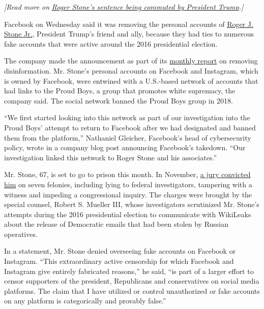 \emph{{[}Read more on}
\href{https://www.nytimes3xbfgragh.onion/2020/07/10/us/politics/trump-roger-stone-clemency.html}{\emph{Roger
Stone's sentence being commuted by President Trump}}\emph{.{]}}

Facebook on Wednesday said it was removing the personal accounts of
\href{https://www.nytimes3xbfgragh.onion/2020/07/19/us/politics/roger-stone-mo-kelly-slur.html}{Roger
J. Stone Jr.}, President Trump's friend and ally, because they had ties
to numerous fake accounts that were active around the 2016 presidential
election.

The company made the announcement as part of its
\href{https://about.fb.com/news/2020/07/removing-political-coordinated-inauthentic-behavior/}{monthly
report} on removing disinformation. Mr. Stone's personal accounts on
Facebook and Instagram, which is owned by Facebook, were entwined with a
U.S.-based network of accounts that had links to the Proud Boys, a group
that promotes white supremacy, the company said. The social network
banned the Proud Boys group in 2018.

``We first started looking into this network as part of our
investigation into the Proud Boys' attempt to return to Facebook after
we had designated and banned them from the platform,'' Nathaniel
Gleicher, Facebook's head of cybersecurity policy, wrote in a company
blog post announcing Facebook's takedown. ``Our investigation linked
this network to Roger Stone and his associates.''

Mr. Stone, 67, is set to go to prison this month. In November,
\href{https://www.nytimes3xbfgragh.onion/2019/11/15/us/politics/roger-stone-trial-guilty.html}{a
jury convicted him} on seven felonies, including lying to federal
investigators, tampering with a witness and impeding a congressional
inquiry. The charges were brought by the special counsel, Robert S.
Mueller III, whose investigators scrutinized Mr. Stone's attempts during
the 2016 presidential election to communicate with WikiLeaks about the
release of Democratic emails that had been stolen by Russian operatives.

In a statement, Mr. Stone denied overseeing fake accounts on Facebook or
Instagram. ``This extraordinary active censorship for which Facebook and
Instagram give entirely fabricated reasons,'' he said, ``is part of a
larger effort to censor supporters of the president, Republicans and
conservatives on social media platforms. The claim that I have utilized
or control unauthorized or fake accounts on any platform is
categorically and provably false.''


